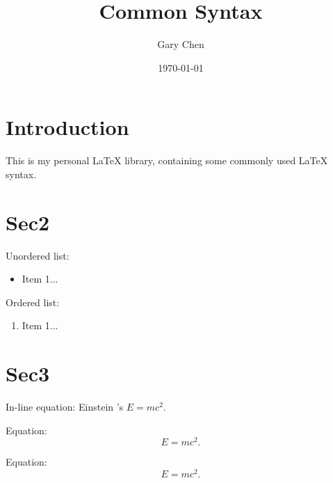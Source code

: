 \documentclass{article}
\title{Common Syntax}
\author{Gary Chen}
\date{\today}
\begin{document}
\maketitle

\tableofcontents

\section{Introduction}

This is my personal LaTeX library, containing some commonly used LaTeX syntax.

\section{Sec2}

Unordered list:
\begin{itemize}
    \item Item 1...
\end{itemize}

Ordered list:
\begin{enumerate}
    \item Item 1...
\end{enumerate}


\section{Sec3}

In-line equation: Einstein 's $E=mc^2$.

Equation:
\[ E=mc^2. \]

Equation:
\begin{equation}
    E=mc^2.
\end{equation}
\end{document}
